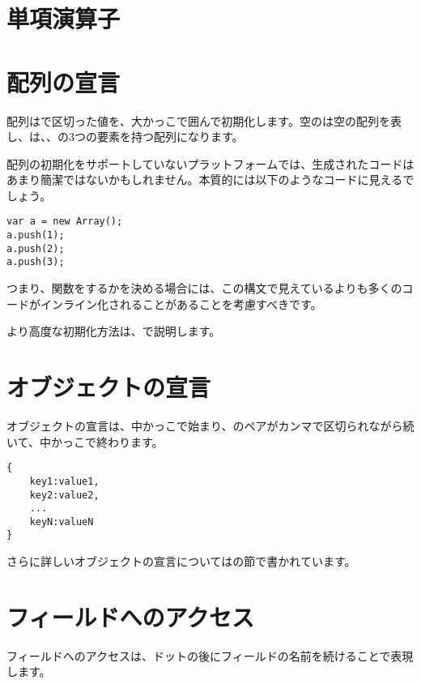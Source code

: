 \section{単項演算子}
\label{expression-unops}

\section{配列の宣言}
\label{expression-array-declaration}

配列は\expr{,}で区切った値を、大かっこ\expr{[]}で囲んで初期化します。空の\expr{[]}は空の配列を表し、\expr{[1, 2, 3]}は、、の3つの要素を持つ配列になります。

配列の初期化をサポートしていないプラットフォームでは、生成されたコードはあまり簡潔ではないかもしれません。本質的には以下のようなコードに見えるでしょう。

\begin{lstlisting}
var a = new Array();
a.push(1);
a.push(2);
a.push(3);
\end{lstlisting}

つまり、関数をするかを決める場合には、この構文で見えているよりも多くのコードがインライン化されることがあることを考慮すべきです。

より高度な初期化方法は、で説明します。

\section{オブジェクトの宣言}
\label{expression-object-declaration}

オブジェクトの宣言は、中かっこ\expr{\{}で始まり、のペアがカンマ\expr{,}で区切られながら続いて、中かっこ\expr{\}}で終わります。

\begin{lstlisting}
{
	key1:value1,
	key2:value2,
	...
	keyN:valueN
}
\end{lstlisting}
さらに詳しいオブジェクトの宣言についてはの節で書かれています。

\section{フィールドへのアクセス}
\label{expression-field-access}

フィールドへのアクセスは、ドットの後にフィールドの名前を続けることで表現します。

